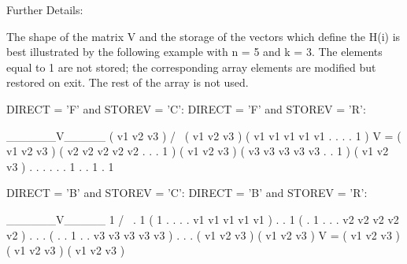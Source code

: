 \begin{DoxyParagraph}{Further Details\+: }
\begin{DoxyVerb}  The shape of the matrix V and the storage of the vectors which define
  the H(i) is best illustrated by the following example with n = 5 and
  k = 3. The elements equal to 1 are not stored; the corresponding
  array elements are modified but restored on exit. The rest of the
  array is not used.

  DIRECT = 'F' and STOREV = 'C':         DIRECT = 'F' and STOREV = 'R':

                                              ______V_____
         ( v1 v2 v3 )                        /            \
         ( v1 v2 v3 )                      ( v1 v1 v1 v1 v1 . . . . 1 )
     V = ( v1 v2 v3 )                      ( v2 v2 v2 v2 v2 . . . 1   )
         ( v1 v2 v3 )                      ( v3 v3 v3 v3 v3 . . 1     )
         ( v1 v2 v3 )
            .  .  .
            .  .  .
            1  .  .
               1  .
                  1

  DIRECT = 'B' and STOREV = 'C':         DIRECT = 'B' and STOREV = 'R':

                                                        ______V_____
            1                                          /            \
            .  1                           ( 1 . . . . v1 v1 v1 v1 v1 )
            .  .  1                        ( . 1 . . . v2 v2 v2 v2 v2 )
            .  .  .                        ( . . 1 . . v3 v3 v3 v3 v3 )
            .  .  .
         ( v1 v2 v3 )
         ( v1 v2 v3 )
     V = ( v1 v2 v3 )
         ( v1 v2 v3 )
         ( v1 v2 v3 )\end{DoxyVerb}
 
\end{DoxyParagraph}
